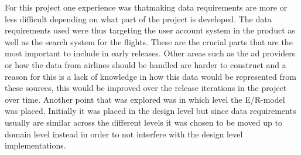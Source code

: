 For this project one experience was thatmaking data requirements are more or less difficult depending on what part of the project is developed. The data requirements used were thus targeting the user
account system in the product as well as the search system for the flights. These are the crucial parts that are the most important to include in early releases.
Other areas such as the ad providers or how the data from airlines should be handled are harder to construct and a reason for this is a lack of knowledge in
how this data would be represented from these sources, this would be improved over the release iterations in the project over time. Another point that was explored was in which level the E/R-model was placed.
Initially it was placed in the design level but since data requirements usually are similar across the different levels it was chosen to be moved up to domain level instead in order to not interfere with the 
design level implementations.
